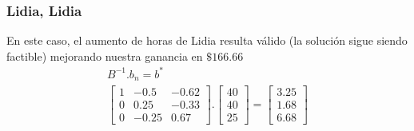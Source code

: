 \begin{homeworkProblem}
\subsubsection{Lidia, Lidia}
En este caso, el aumento de horas de Lidia resulta válido (la solución sigue siendo factible) mejorando nuestra ganancia en $\$166.66$
\begin{align*}
    B^{-1}.b_n = b^{*} \\
    \begin{bmatrix}
        1 & -0.5 & -0.62 \\
        0 & 0.25 & -0.33 \\
        0 & -0.25 & 0.67 
    \end{bmatrix}.
    \begin{bmatrix}
        40 \\
        40 \\
        25
    \end{bmatrix}=
    \begin{bmatrix}
        3.25 \\
        1.68\\
        6.68
    \end{bmatrix}
\end{align*}

\end{homeworkProblem}